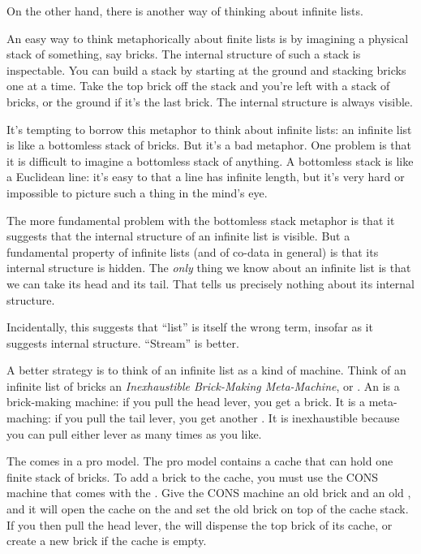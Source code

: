 \documentclass{article}
\begin{document}
On the other hand, there is another way of thinking about infinite
lists.

An easy way to think metaphorically about finite lists is by imagining
a physical stack of something, say bricks. The internal structure of
such a stack is inspectable. You can build a stack by starting at the
ground and stacking bricks one at a time. Take the top brick off the
stack and you're left with a stack of bricks, or the ground if it's the
last brick.  The internal structure is always visible.

It's tempting to borrow this metaphor to think about infinite lists:
an infinite list is like a bottomless stack of bricks. But it's a bad
metaphor. One problem is that it is difficult to imagine a bottomless
stack of anything. A bottomless stack is like a Euclidean line: it's
easy to  that a line has infinite length, but it's very hard
or impossible to picture such a thing in the mind's eye.

The more fundamental problem with the bottomless stack metaphor is
that it suggests that the internal structure of an infinite list is
visible. But a fundamental property of infinite lists (and of co-data
in general) is that its internal structure is hidden. The
\textit{only} thing we know about an infinite list is that we can take
its head and its tail. That tells us precisely nothing about its
internal structure.

Incidentally, this suggests that ``list'' is itself the wrong term,
insofar as it suggests internal structure. ``Stream'' is better.

A better strategy is to think of an infinite list as a kind of
machine. Think of an infinite list of bricks an \textit{Inexhaustible
  Brick-Making Meta-Machine}, or \IBMMM. An \IBMMM is a brick-making
machine: if you pull the \textsf{head} lever, you get a brick. It is a
meta-maching: if you pull the \textsf{tail} lever, you get another
\IBMMM. It is inexhaustible because you can pull either lever as many
times as you like.

The \IBMMM comes in a pro model. The pro model contains a cache that
can hold one finite stack of bricks. To add a brick to the cache, you
must use the \textsf{CONS} machine that comes with the \IBMMM. Give
the \textsf{CONS} machine an old brick and an old \IBMMM, and it will
open the cache on the \IBMMM and set the old brick on top of the cache
stack. If you then pull the \textsf{head} lever, the \IBMMM will
dispense the top brick of its cache, or create a new brick if the
cache is empty.
\end{document}
